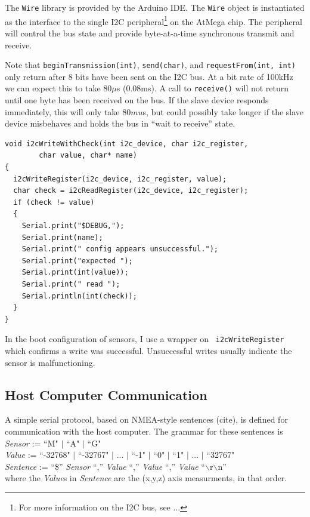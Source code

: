 \documentclass[12pt]{report}
\begin{document}
The \lstinline$Wire$ library is provided by the Arduino IDE.  The \lstinline$Wire$ object is instantiated as the interface to the single I2C peripheral\footnote{For more information on the I2C bus, see ...} on the AtMega chip. The peripheral will control the bus state and provide byte-at-a-time synchronous transmit and receive. 

Note that \lstinline$beginTransmission(int)$, \lstinline$send(char)$, and \lstinline$requestFrom(int, int)$ only return after 8 bits have been sent on the I2C bus. At a bit rate of 100kHz we can expect this to take 80$\mu$s (0.08ms). A call to \lstinline$receive()$ will not return until one byte has been received on the bus. If the slave device responds immediately, this will only take 80$mu$s, but could possibly take longer if the slave device misbehaves and holds the bus in ``wait to receive'' state.
\begin{lstlisting}
void i2cWriteWithCheck(int i2c_device, char i2c_register, 
        char value, char* name)
{
  i2cWriteRegister(i2c_device, i2c_register, value);
  char check = i2cReadRegister(i2c_device, i2c_register);
  if (check != value)
  {
    Serial.print("$DEBUG,");
    Serial.print(name);
    Serial.print(" config appears unsuccessful.");
    Serial.print("expected ");
    Serial.print(int(value));
    Serial.print(" read ");
    Serial.println(int(check));
  }
}
\end{lstlisting}
In the boot configuration of sensors, I use a wrapper on \lstinline$ i2cWriteRegister $ which confirms a write was successful. Unsuccessful writes usually indicate the sensor is malfunctioning.


\subsection{Host Computer Communication}
A simple serial protocol, based on NMEA-style sentences (cite), is defined for communication with the host computer. The grammar for these sentences is \\
\emph{Sensor} := ``M" $|$ ``A" $|$ ``G" \\
\emph{Value} := ``-32768" $|$ ``-32767" $|$ ... $|$ ``-1" $|$ ``0" $|$ ``1" $|$ ... $|$ ``32767" \\
\emph{Sentence} := ``\$'' \emph{Sensor} ``,'' \emph{Value} ``,'' \emph{Value} ``,'' \emph{Value} ``$\backslash$r$\backslash$n'' \\
where the \emph{Value}s in \emph{Sentence} are the (x,y,z) axis measurments, in that order.
\end{document}

